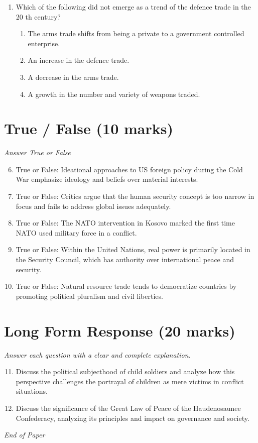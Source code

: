 \documentclass[12pt]{article}
\begin{document}
\begin{enumerate}[label=\arabic*.]
\begin{enumerate}[label=(\alph*)]
    \item 1990 s
    \item 1960 s
    \item 1980 s
\end{enumerate}
\item Which of the following did not emerge as a trend of the defence trade in the 20 th century?
\begin{enumerate}[label=(\alph*)]
    \item The arms trade shifts from being a private to a government controlled enterprise.
    \item An increase in the defence trade.
    \item A decrease in the arms trade.
    \item A growth in the number and variety of weapons traded.
\end{enumerate}
\end{enumerate}

\section*{True / False (10 marks)}
\textit{Answer True or False}
\begin{enumerate}[label=\arabic*.]
\setcounter{enumi}{5}
\item True or False: Ideational approaches to US foreign policy during the Cold War emphasize ideology and beliefs over material interests.
\item True or False: Critics argue that the human security concept is too narrow in focus and fails to address global issues adequately.
\item True or False: The NATO intervention in Kosovo marked the first time NATO used military force in a conflict.
\item True or False: Within the United Nations, real power is primarily located in the Security Council, which has authority over international peace and security.
\item True or False: Natural resource trade tends to democratize countries by promoting political pluralism and civil liberties.
\end{enumerate}

\section*{Long Form Response (20 marks)}
\textit{Answer each question with a clear and complete explanation.}
\begin{enumerate}[label=\arabic*.]
\setcounter{enumi}{10}
\item Discuss the political subjecthood of child soldiers and analyze how this perspective challenges the portrayal of children as mere victims in conflict situations.
\item Discuss the significance of the Great Law of Peace of the Haudenosaunee Confederacy, analyzing its principles and impact on governance and society.
\end{enumerate}

\vfill
\noindent\textit{End of Paper}
\end{document}
